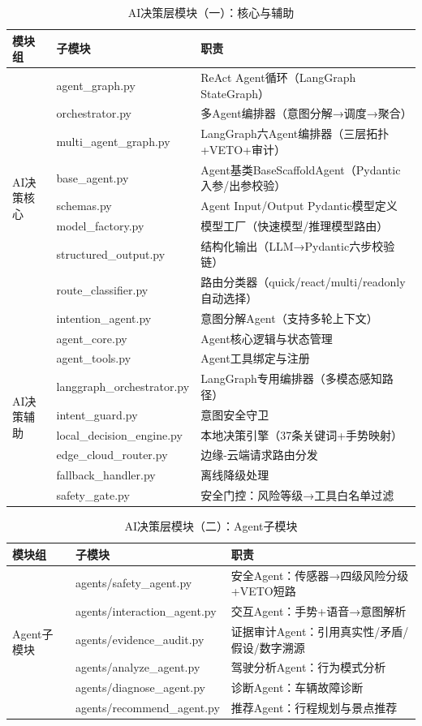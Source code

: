 \documentclass[a4paper]{article}
\begin{document}
\begin{table}[htbp]
  \centering\small
  \caption{AI决策层模块（一）：核心与辅助}
  \label{tab:modules2}
  \begin{tabular}{lll}
  \toprule
  模块组 & 子模块 & 职责 \\
  \midrule
  \multirow{9}{*}{AI决策核心} & agent\_graph.py & ReAct Agent循环（LangGraph StateGraph）\\
  & orchestrator.py & 多Agent编排器（意图分解→调度→聚合）\\
  & multi\_agent\_graph.py & LangGraph六Agent编排器（三层拓扑+VETO+审计）\\
  & base\_agent.py & Agent基类BaseScaffoldAgent（Pydantic入参/出参校验）\\
  & schemas.py & Agent Input/Output Pydantic模型定义 \\
  & model\_factory.py & 模型工厂（快速模型/推理模型路由）\\
  & structured\_output.py & 结构化输出（LLM→Pydantic六步校验链）\\
  & route\_classifier.py & 路由分类器（quick/react/multi/readonly自动选择）\\
  & intention\_agent.py & 意图分解Agent（支持多轮上下文）\\
  \midrule
  \multirow{8}{*}{AI决策辅助} & agent\_core.py & Agent核心逻辑与状态管理 \\
  & agent\_tools.py & Agent工具绑定与注册 \\
  & langgraph\_orchestrator.py & LangGraph专用编排器（多模态感知路径）\\
  & intent\_guard.py & 意图安全守卫 \\
  & local\_decision\_engine.py & 本地决策引擎（37条关键词+手势映射）\\
  & edge\_cloud\_router.py & 边缘-云端请求路由分发 \\
  & fallback\_handler.py & 离线降级处理 \\
  & safety\_gate.py & 安全门控：风险等级→工具白名单过滤 \\
  \bottomrule
  \end{tabular}
\end{table}

\begin{table}[htbp]
  \centering\small
  \caption{AI决策层模块（二）：Agent子模块}
  \label{tab:modules2b}
  \begin{tabular}{lll}
  \toprule
  模块组 & 子模块 & 职责 \\
  \midrule
  \multirow{6}{*}{Agent子模块} & agents/safety\_agent.py & 安全Agent：传感器→四级风险分级+VETO短路 \\
  & agents/interaction\_agent.py & 交互Agent：手势+语音→意图解析 \\
  & agents/evidence\_audit.py & 证据审计Agent：引用真实性/矛盾/假设/数字溯源 \\
  & agents/analyze\_agent.py & 驾驶分析Agent：行为模式分析 \\
  & agents/diagnose\_agent.py & 诊断Agent：车辆故障诊断 \\
  & agents/recommend\_agent.py & 推荐Agent：行程规划与景点推荐 \\
  \bottomrule
  \end{tabular}
\end{table}
\end{document}

